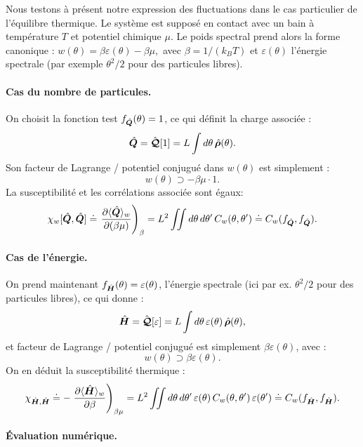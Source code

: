 Nous testons à présent notre expression des fluctuations dans le cas particulier de l'équilibre thermique. Le système est supposé en contact avec un bain à température \( T \) et potentiel chimique \( \mu \). Le poids spectral prend alors la forme canonique :
\(
w(\theta) = \beta \varepsilon(\theta) - \beta \mu,
\)
avec \( \beta = 1 / (k_B T) \) et \( \varepsilon(\theta) \) l’énergie spectrale (par exemple \( \theta^2/2 \) pour des particules libres).
 

\paragraph{Cas du nombre de particules.}
On choisit la fonction test \( f_{\hat{\bm{Q}}}(\theta) = 1 \), ce qui définit la charge associée :
\[
\hat{\bm{Q}} = \hat{\bm{\mathcal{Q}}}[1] = L \int d\theta\, \hat{\bm{\rho}}(\theta).
\]
Son facteur de Lagrange / potentiel conjugué dans \( w(\theta) \) est simplement :
\[
w(\theta) \supset -\beta \mu \cdot 1.
\]
La susceptibilité  et les corrélations associée sont égaux:
\[
\chi_w[{\hat{\bm{Q}},\hat{\bm{Q}}}] \doteq \left . \frac{\partial \langle \hat{\bm{Q}} \rangle_w}{\partial (\beta \mu)} \right)_\beta  = L^2 \iint d\theta\, d\theta'\, C_w(\theta, \theta') \doteq C_w(f_{\hat{\bm{Q}}}, f_{\hat{\bm{Q}}}).
\]

\paragraph{Cas de l’énergie.}
On prend maintenant \( f_{\hat{\bm{H}}}(\theta) = \varepsilon(\theta) \), l’énergie spectrale (ici par ex. \( \theta^2/2 \) pour des particules libres), ce qui donne :
\[
\hat{\bm{H}} = \hat{\bm{\mathcal{Q}}}[\varepsilon] = L \int d\theta\, \varepsilon(\theta)\, \hat{\bm{\rho}}(\theta),
\]
et facteur de Lagrange / potentiel conjugué  est simplement \( \beta \varepsilon(\theta) \), avec :
\[
w(\theta) \supset \beta \varepsilon(\theta).
\]
On en déduit la susceptibilité thermique :
\[
\chi_{\hat{\bm{H}},\hat{\bm{H}}} \doteq -\left.\frac{\partial \langle \hat{\bm{H}} \rangle_w}{\partial \beta} \right)_{\beta \mu}  = L^2 \iint d\theta\, d\theta'\, \varepsilon(\theta)\, C_w(\theta, \theta')\, \varepsilon(\theta') \doteq C_w(f_{\hat{\bm{H}}}, f_{\hat{\bm{H}}}).
\]

\paragraph{Évaluation numérique.}


